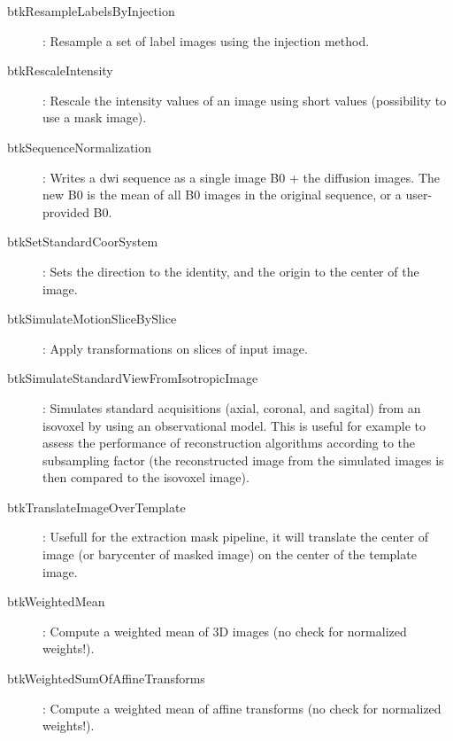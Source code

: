 \begin{description}
\item[btkResampleLabelsByInjection]: Resample a set of label images using the injection method.
\item[btkRescaleIntensity]: Rescale the intensity values of an image using short values (possibility to use a mask image).
\item[btkSequenceNormalization]: Writes a dwi sequence as a single image B0 + the diffusion images. The new B0 is the mean of all B0 images in the original sequence, or a user-provided B0.
\item[btkSetStandardCoorSystem]: Sets the direction to the identity, and the origin to the center of the image.
\item[btkSimulateMotionSliceBySlice]: Apply transformations on slices of input image.
\item[btkSimulateStandardViewFromIsotropicImage]: Simulates standard acquisitions (axial, coronal, and sagital) from an isovoxel by using an observational model. This is useful for example to assess the performance of reconstruction algorithms according to the subsampling factor (the reconstructed image from the simulated images is then compared to the isovoxel image). 
\item[btkTranslateImageOverTemplate]: Usefull for the extraction mask pipeline, it will translate the center of image (or barycenter of masked image) on the center of the template image.
\item[btkWeightedMean]: Compute a weighted mean of 3D images (no check for normalized weights!).
\item[btkWeightedSumOfAffineTransforms]: Compute a weighted mean of affine transforms (no check for normalized weights!).



\end{description}
